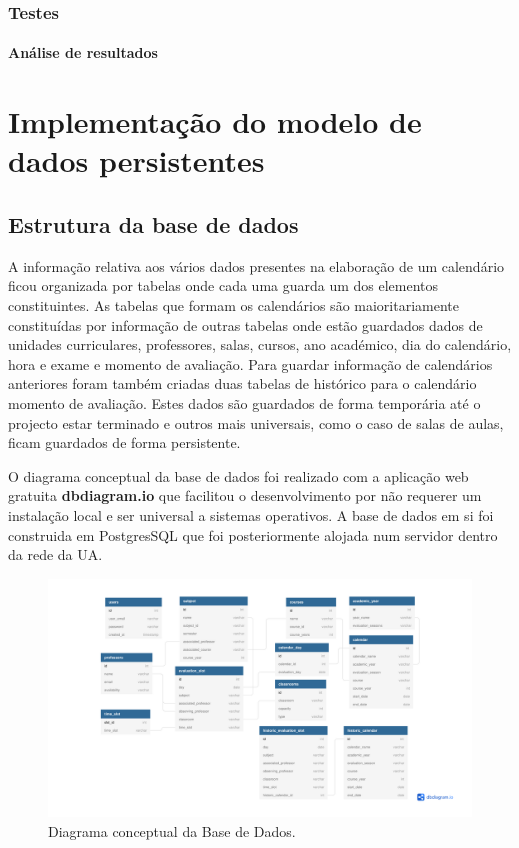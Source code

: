 \documentclass[11pt, twoside]{report}
\begin{document}
	\subsection{Testes}
	\subsubsection{Análise de resultados}
	
	\chapter{Implementação do modelo de dados persistentes}
	\section{Estrutura da base de dados}
	A informação relativa aos vários dados presentes na elaboração de um calendário ficou organizada por tabelas onde cada uma guarda um dos elementos constituintes.
	As tabelas que formam os calendários são maioritariamente constituídas por informação de outras tabelas onde estão guardados dados de unidades curriculares, professores, salas, cursos, ano académico, dia do calendário, hora e exame e momento de avaliação.
	Para guardar informação de calendários anteriores foram também criadas duas tabelas de histórico para o calendário momento de avaliação.
	Estes dados são guardados de forma temporária até o projecto estar terminado e outros mais universais, como o caso de salas de aulas, ficam guardados de forma persistente.
	
	O diagrama conceptual da base de dados foi realizado com a aplicação web gratuita \textbf{dbdiagram.io} que facilitou o desenvolvimento por não requerer um instalação local e ser universal a sistemas operativos.
	A base de dados em si foi construida em PostgresSQL que foi posteriormente alojada num servidor dentro da rede da UA.
	\begin{figure}[H]
		\centering
		\includegraphics[width=0.95\linewidth]{image/Calendario_DB}
		\caption{Diagrama conceptual da Base de Dados.}
		\label{fig:calendariodb}
	\end{figure}
	
\end{document}
